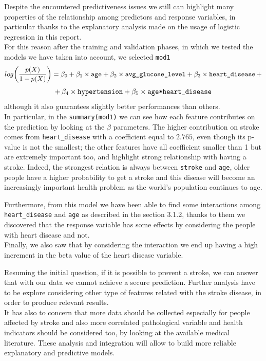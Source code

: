 \documentclass[
]{article}
\begin{document}
Despite the encountered predictiveness issues we still can highlight
many properties of the relationship among predictors and response
variables, in particular thanks to the explanatory analysis made on the
usage of logistic regression in this report.\\
For this reason after the training and validation phases, in which we
tested the models we have taken into account, we selected \texttt{mod1}
\[log\bigg(\frac{p(X)}{1-p(X)}\bigg) = \beta_0 + \beta_1\times \verb|age| + \beta_2\times \verb|avg_glucose_level| + \beta_3 \times \verb|heart_disease| \,+ \]
\[+\, \beta_4 \times\verb|hypertension| + \beta_5 \times \verb |age*heart_disease|\]
although it also guarantees slightly better performances than others.\\
In particular, in the \texttt{summary(mod1)} we can see how each feature
contributes on the prediction by looking at the \(\beta\) parameters.
The higher contribution on stroke comes from \texttt{heart\_disease}
with a coefficient equal to \(2.765\), even though its p-value is not
the smallest; the other features have all coefficient smaller than 1 but
are extremely important too, and highlight strong relationship with
having a stroke. Indeed, the strongest relation is always between
\texttt{stroke} and \texttt{age}, older people have a higher probability
to get a stroke and this disease will become an increasingly important
health problem as the world's population continues to age.

Furthermore, from this model we have been able to find some interactions
among \texttt{heart\_disease} and \texttt{age} as described in the
section 3.1.2, thanks to them we discovered that the response variable has
some effects by considering the people with heart disease and not.\\
Finally, we also saw that by considering the interaction we end up
having a high increment in the beta value of the heart disease variable.

Resuming the initial question, if it is possible to prevent a stroke, we
can answer that with our data we cannot achieve a secure prediction. Further analysis have to be explore considering other type of features
related with the stroke disease, in order to produce relevant results.\\
It has also to concern that more data should be collected especially for
people affected by stroke and also more correlated pathological variable
and health indicators should be considered too, by looking at the
available medical literature. These analysis and integration will allow
to build more reliable explanatory and predictive models.
\end{document}
